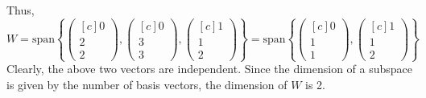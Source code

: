 \documentclass{article}
\begin{document}
Thus, $$W = \text{span} \left\{ \begin{pmatrix}[c] 0 \\ 2 \\ 2  \end{pmatrix}, \begin{pmatrix}[c] 0 \\ 3 \\ 3  \end{pmatrix}, \begin{pmatrix}[c] 1 \\ 1 \\ 2 \end{pmatrix} \right\} =  \text{span} \left\{ \begin{pmatrix}[c] 0 \\ 1 \\ 1  \end{pmatrix}, \begin{pmatrix}[c] 1 \\ 1 \\ 2 \end{pmatrix} \right\}$$
Clearly, the above two vectors are independent. Since the dimension of a subspace is given by the number of basis vectors, the dimension of $W$ is 2.
\end{document}
